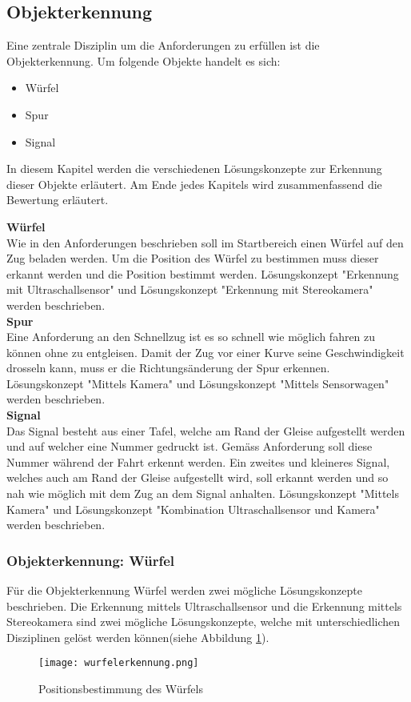 \documentclass[../../main.tex]{subfiles}
\begin{document}
    \subsection{Objekterkennung}
    Eine zentrale Disziplin um die Anforderungen zu erfüllen ist die Objekterkennung. Um folgende Objekte handelt es sich:

    \begin{itemize}
        \item Würfel
        \item Spur
        \item Signal
    \end{itemize}
    \vspace{0.5cm}

    In diesem Kapitel werden die verschiedenen Lösungskonzepte zur Erkennung dieser Objekte erläutert. Am Ende jedes Kapitels wird zusammenfassend die Bewertung erläutert.

    \textbf{Würfel}\\
    Wie in den Anforderungen beschrieben soll im Startbereich einen Würfel auf den Zug beladen werden. Um die Position des Würfel zu bestimmen muss dieser erkannt werden
    und die Position bestimmt werden. Lösungskonzept "Erkennung mit Ultraschallsensor" und Lösungskonzept "Erkennung mit Stereokamera" werden beschrieben.\\

    \textbf{Spur}\\
    Eine Anforderung an den Schnellzug ist es so schnell wie möglich fahren zu können ohne zu entgleisen. Damit der Zug vor einer Kurve seine Geschwindigkeit
    drosseln kann, muss er die Richtungsänderung der Spur erkennen. Lösungskonzept "Mittels Kamera" und Lösungskonzept "Mittels Sensorwagen" werden beschrieben.\\

    \textbf{Signal}\\
    Das Signal besteht aus einer Tafel, welche am Rand der Gleise aufgestellt werden und auf welcher eine Nummer gedruckt ist. Gemäss Anforderung soll diese Nummer
    während der Fahrt erkennt werden. Ein zweites und kleineres Signal, welches auch am Rand der Gleise aufgestellt wird, soll erkannt werden und so nah wie möglich 
    mit dem Zug an dem Signal anhalten. Lösungskonzept "Mittels Kamera" und Lösungskonzept "Kombination Ultraschallsensor und Kamera" werden beschrieben.


    \subsubsection{Objekterkennung: Würfel}
    Für die Objekterkennung Würfel werden zwei mögliche Lösungskonzepte beschrieben. Die Erkennung mittels Ultraschallsensor und die Erkennung mittels Stereokamera sind zwei mögliche Lösungskonzepte, welche mit unterschiedlichen Disziplinen gelöst werden können(siehe Abbildung \ref{fig:wurfelerkennung}).
    \begin{figure}[H] %
        \centering
        \texttt{[image: wurfelerkennung.png]}
        \caption{Positionsbestimmung des Würfels}
        \label{fig:wurfelerkennung}
    \end{figure}
\end{document}
